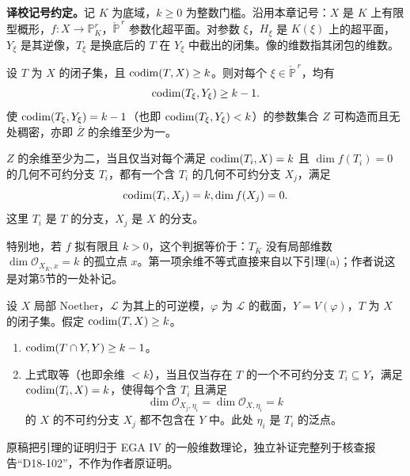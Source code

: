 \begingroup
\def\PP{\mathbb P}\def\OO{\mathcal O}\def\Ocal{\mathcal O}
\def\F{\mathcal F}\def\G{\mathcal G}\def\N{\mathcal N}
\def\PD{\check P}\def\Pdual{\check P}
\def\Ys{Y^{\mathrm{sing}}}\def\Ysing{Y^{\mathrm{sing}}}
\def\Ds{Y^{\mathrm{sup\,sing}}}\def\Ysup{Y^{\mathrm{sup\,sing}}}
\def\cod{\operatorname{codim}}\def\Sing{\operatorname{Sing}}
\def\depth{\operatorname{depth}}\def\coprof{\operatorname{coprof}}
\def\Ass{\operatorname{Ass}}\def\Supp{\operatorname{Supp}}
\def\Gr{\operatorname{Gr}}\def\Spec{\operatorname{Spec}}\def\Proj{\operatorname{Proj}}
\noindent\textbf{译校记号约定。}记 $K$ 为底域，$k\ge0$ 为整数门槛。沿用本章记号：$X$ 是 $K$ 上有限型概形，$f:X\to\PP^r_K$，$\check{\PP}^{\,r}$ 参数化超平面。对参数 $\xi$，$H_\xi$ 是 $K(\xi)$ 上的超平面，$Y_\xi$ 是其逆像，$T_\xi$ 是换底后的 $T$ 在 $Y_\xi$ 中截出的闭集。像的维数指其闭包的维数。

设 $T$ 为 $X$ 的闭子集，且 $\operatorname{codim}(T,X)\ge k$。则对每个 $\xi\in\check{\PP}^{\,r}$，均有
\[
 \operatorname{codim}(T_\xi,Y_\xi)\ge k-1.
\]
使 $\operatorname{codim}(T_\xi,Y_\xi)=k-1$（也即 $\operatorname{codim}(T_\xi,Y_\xi)<k$）的参数集合 $Z$ 可构造而且无处稠密，亦即 $\overline Z$ 的余维至少为一。

$Z$ 的余维至少为二，当且仅当对每个满足 $\operatorname{codim}(T_i,X)=k$ 且 $\dim f(T_i)=0$ 的几何不可约分支 $T_i$，都有一个含 $T_i$ 的几何不可约分支 $X_j$，满足
\[
 \operatorname{codim}(T_i,X_j)=k, \dim f(X_j)=0.
\]
这里 $T_i$ 是 $T$ 的分支，$X_j$ 是 $X$ 的分支。

特别地，若 $f$ 拟有限且 $k>0$，这个判据等价于：$T_{\overline K}$ 没有局部维数 $\dim\OO_{X_{\overline K},x}=k$ 的孤立点 $x$。第一项余维不等式直接来自以下引理(a)；作者说这是对第5节的一处补记。


设 $X$ 局部 Noether，$\mathcal L$ 为其上的可逆模，$\varphi$ 为 $\mathcal L$ 的截面，$Y=V(\varphi)$，$T$ 为 $X$ 的闭子集。假定 $\operatorname{codim}(T,X)\ge k$。
\begin{enumerate}
\renewcommand{\labelenumi}{\alph{enumi})}
\item $\operatorname{codim}(T\cap Y,Y)\ge k-1$。
\item 上式取等（也即余维 $<k$），当且仅当存在 $T$ 的一个不可约分支 $T_i\subseteq Y$，满足 $\operatorname{codim}(T_i,X)=k$，使得每个含 $T_i$ 且满足
\[
 \dim\OO_{X_j,\eta_i}=\dim\OO_{X,\eta_i}=k
\]
的 $X$ 的不可约分支 $X_j$ 都不包含在 $Y$ 中。此处 $\eta_i$ 是 $T_i$ 的泛点。
\end{enumerate}
原稿把引理的证明归于 EGA IV 的一般维数理论，独立补证完整列于核查报告“D18-102”，不作为作者原证明。

